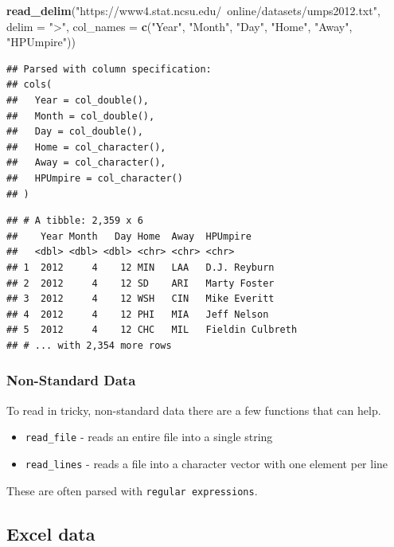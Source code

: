\documentclass[
]{book}
\newenvironment{Shaded}{\begin{snugshade}}{\end{snugshade}}
\newcommand{\DataTypeTok}[1]{\textcolor[rgb]{0.13,0.29,0.53}{#1}}
\newcommand{\KeywordTok}[1]{\textcolor[rgb]{0.13,0.29,0.53}{\textbf{#1}}}
\newcommand{\NormalTok}[1]{#1}
\newcommand{\StringTok}[1]{\textcolor[rgb]{0.31,0.60,0.02}{#1}}
\theoremstyle{definition}
\theoremstyle{definition}
\theoremstyle{definition}
\theoremstyle{remark}
\begin{document}
\begin{Shaded}
\begin{Highlighting}[]
\KeywordTok{read_delim}\NormalTok{(}\StringTok{"https://www4.stat.ncsu.edu/~online/datasets/umps2012.txt"}\NormalTok{, }\DataTypeTok{delim =} \StringTok{">"}\NormalTok{,}
           \DataTypeTok{col_names =} \KeywordTok{c}\NormalTok{(}\StringTok{"Year"}\NormalTok{, }\StringTok{"Month"}\NormalTok{, }\StringTok{"Day"}\NormalTok{, }\StringTok{"Home"}\NormalTok{, }\StringTok{"Away"}\NormalTok{, }\StringTok{"HPUmpire"}\NormalTok{))}
\end{Highlighting}
\end{Shaded}

\begin{verbatim}
## Parsed with column specification:
## cols(
##   Year = col_double(),
##   Month = col_double(),
##   Day = col_double(),
##   Home = col_character(),
##   Away = col_character(),
##   HPUmpire = col_character()
## )
\end{verbatim}

\begin{verbatim}
## # A tibble: 2,359 x 6
##    Year Month   Day Home  Away  HPUmpire        
##   <dbl> <dbl> <dbl> <chr> <chr> <chr>           
## 1  2012     4    12 MIN   LAA   D.J. Reyburn    
## 2  2012     4    12 SD    ARI   Marty Foster    
## 3  2012     4    12 WSH   CIN   Mike Everitt    
## 4  2012     4    12 PHI   MIA   Jeff Nelson     
## 5  2012     4    12 CHC   MIL   Fieldin Culbreth
## # ... with 2,354 more rows
\end{verbatim}

\hypertarget{non-standard-data}{%
\subsubsection{Non-Standard Data}\label{non-standard-data}}

To read in tricky, non-standard data there are a few functions that can help.

\begin{itemize}
\item
  \texttt{read\_file} - reads an entire file into a single string
\item
  \texttt{read\_lines} - reads a file into a character vector with one element per line
\end{itemize}

These are often parsed with \texttt{regular\ expressions}.

\hypertarget{excel-data}{%
\subsection{Excel data}\label{excel-data}}
\end{document}
